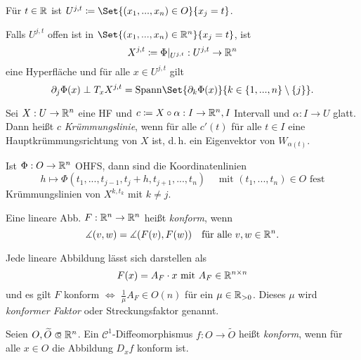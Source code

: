 \documentclass{cheat-sheet}
\begin{document}
\begin{nota}
  Für $t \in \mathbb{R}$ ist $U^{j,t} \coloneqq \Set{ (x_1, ..., x_n) \in O }{ x_j = t }$.
\end{nota}

\begin{bem}
  Falls $U^{j,t}$ offen ist in $\Set{ (x_1, ..., x_n) \in \R^n }{ x_j = t }$, ist
  \[ X^{j,t} \coloneqq \Phi|_{U^{j,t}} : U^{j,t} \to \mathbb{R}^n \]
  eine Hyperfläche und für alle $x \in U^{j,t}$ gilt
  \[ \partial_j \Phi(x) \perp T_x X^{j,t} = \mathrm{Spann} \Set{ \partial_k \Phi(x) }{ k \in \{ 1, ..., n \} \setminus \{ j \} }. \]
\end{bem}

\begin{defn}
  Sei $X : U \to \mathbb{R}^n$ eine HF und $c \coloneqq X \circ \alpha : I \to \mathbb{R}^n, I$ Intervall und $\alpha : I \to U$ glatt. Dann heißt $c$ \emph{Krümmungslinie}, wenn für alle $c'(t)$ für alle $t \in I$ eine Hauptkrümmungsrichtung von $X$ ist, d.\,h. ein Eigenvektor von $W_{\alpha(t)}$.
\end{defn}

\begin{satz}
  Ist $\Phi : O \to \mathbb{R}^n$ OHFS, dann sind die Koordinatenlinien
  \[ h \mapsto \Phi(t_1, ..., t_{j-1}, t_j + h, t_{j+1}, ..., t_n) \quad \text{ mit } (t_1, ..., t_n) \in O \text{ fest} \]
  Krümmungslinien von $X^{k, t_k}$ mit $k \not= j$.
\end{satz}

\begin{defn}
  Eine lineare Abb. $F : \mathbb{R}^n \to \mathbb{R}^n$ heißt \emph{konform}, wenn
  \[ \measuredangle (v, w) = \measuredangle (F(v), F(w)) \quad \text{für alle } v, w \in \mathbb{R}^n. \]
\end{defn}

\begin{bem}
  Jede lineare Abbildung lässt sich darstellen als
  \[ F(x) = A_F \cdot x \text{ mit } A_F \in \mathbb{R}^{n \times n} \]
  und es gilt $F$ konform $\iff$ $\tfrac{1}{\mu} A_F \in O(n)$ für ein $\mu \in \mathbb{R}_{> 0}$. Dieses $\mu$ wird \emph{konformer Faktor} oder Streckungsfaktor genannt.
\end{bem}

\begin{defn}
  Seien $O, \widetilde{O} \opn \R^n$. Ein $\mathcal{C}^1$-Diffeomorphismus $f : O \to \widetilde{O}$ heißt \emph{konform}, wenn für alle $x \in O$ die Abbildung $D_x f$ konform ist.
\end{defn}
\end{document}
